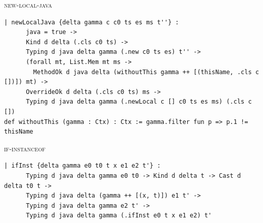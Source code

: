 \begin{cmp}{\textsc{new-local-java}}
\begin{paperside}
\end{paperside}
\begin{leanside}
\begin{lstlisting}[style=leanside]
  | newLocalJava {delta gamma c c0 ts es ms t''} :
      java = true ->
      Kind d delta (.cls c0 ts) ->
      Typing d java delta gamma (.new c0 ts es) t'' ->
      (forall mt, List.Mem mt ms ->
        MethodOk d java delta (withoutThis gamma ++ [(thisName, .cls c [])]) mt) ->
      OverrideOk d delta (.cls c0 ts) ms ->
      Typing d java delta gamma (.newLocal c [] c0 ts es ms) (.cls c [])
def withoutThis (gamma : Ctx) : Ctx := gamma.filter fun p => p.1 != thisName
\end{lstlisting}
\end{leanside}
\end{cmp}

\begin{cmp}{\textsc{if-instanceof}}
\begin{paperside}
\end{paperside}
\begin{leanside}
\begin{lstlisting}[style=leanside]
  | ifInst {delta gamma e0 t0 t x e1 e2 t'} :
      Typing d java delta gamma e0 t0 -> Kind d delta t -> Cast d delta t0 t ->
      Typing d java delta (gamma ++ [(x, t)]) e1 t' ->
      Typing d java delta gamma e2 t' ->
      Typing d java delta gamma (.ifInst e0 t x e1 e2) t'
\end{lstlisting}
\end{leanside}
\end{cmp}

